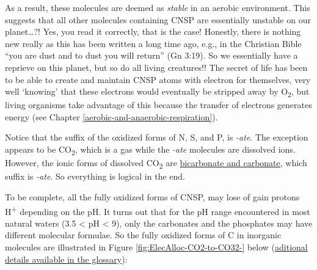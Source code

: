 \documentclass[]{book}
\theoremstyle{definition}
\theoremstyle{definition}
\theoremstyle{definition}
\theoremstyle{remark}
\begin{document}
As a result, these molecules are deemed as \emph{stable} in an aerobic
environment. This suggests that all other molecules containing CNSP are
essentially unstable on our planet\ldots{}?! Yes, you read it correctly,
that is the case! Honestly, there is nothing new really as this has been
written a long time ago, e.g., in the Christian Bible ``you are dust and
to dust you will return'' (Gn 3:19). So we essentially have a reprieve
on this planet, but so do all living creatures!! The secret of life has
been to be able to create and maintain CNSP atoms with electron for
themselves, very well `knowing' that these electrons would eventually be
stripped away by O\textsubscript{2}, but living organisms take advantage
of this because the transfer of electrons generates energy (see Chapter
\ref{aerobic-and-anaerobic-respiration}).

Notice that the suffix of the oxidized forms of N, S, and P, is
\emph{-ate}. The exception appears to be CO\textsubscript{2}, which is a
gas while the \emph{-ate} molecules are dissolved ions. However, the
ionic forms of dissolved CO\textsubscript{2} are
\protect\hyperlink{carbonates}{bicarbonate and carbonate}, which suffix
is \emph{-ate}. So everything is logical in the end.

To be complete, all the fully oxidized forms of CNSP, may lose of gain
protons H\textsuperscript{+} depending on the pH. It turns out that for
the pH range encountered in most natural waters (3.5 \textless{} pH
\textless{} 9), only the carbonates and the phosphates may have
different molecular formulae. So the fully oxidized forms of C in
inorganic molecules are illustrated in Figure
\ref{fig:ElecAlloc-CO2-to-CO32-} below
(\protect\hyperlink{carbonates}{aditional details available in the
glossary}):
\end{document}
